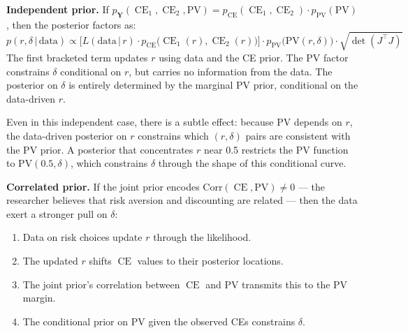 \documentclass[11pt,a4paper]{article}
\theoremstyle{definition}
\newcommand{\given}{\,|\,}
\DeclareMathOperator{\CE}{CE}
\begin{document}
\medskip
\noindent \textbf{Independent prior.} If
$p_{\mathbf{Y}}(\CE_1, \CE_2, \mathrm{PV}) =
p_{\text{CE}}(\CE_1, \CE_2) \cdot p_{\text{PV}}(\mathrm{PV})$,
then the posterior factors as:
\begin{equation}
    p(r, \delta \given \text{data}) \propto
    \Big[L(\text{data} \given r) \cdot p_{\text{CE}}\!\big(\CE_1(r),
    \CE_2(r)\big)\Big]
    \cdot p_{\text{PV}}\!\big(\mathrm{PV}(r, \delta)\big)
    \cdot \sqrt{\det(J^\top J)}
\end{equation}
The first bracketed term updates $r$ using data and the CE prior. The PV
factor constrains $\delta$ conditional on $r$, but carries no information
from the data. The posterior on $\delta$ is entirely determined by the
marginal PV prior, conditional on the data-driven $r$.

Even in this independent case, there is a subtle effect: because $\mathrm{PV}$
depends on $r$, the data-driven posterior on $r$ constrains which $(r, \delta)$
pairs are consistent with the PV prior. A posterior that concentrates $r$ near
0.5 restricts the PV function to $\mathrm{PV}(0.5, \delta)$, which constrains
$\delta$ through the shape of this conditional curve.

\medskip
\noindent \textbf{Correlated prior.} If the joint prior encodes
$\text{Corr}(\CE, \mathrm{PV}) \neq 0$ --- the researcher believes that risk
aversion and discounting are related --- then the data exert a stronger pull
on $\delta$:
\begin{enumerate}
    \item Data on risk choices update $r$ through the likelihood.
    \item The updated $r$ shifts $\CE$ values to their posterior locations.
    \item The joint prior's correlation between $\CE$ and $\mathrm{PV}$
    transmits this to the PV margin.
    \item The conditional prior on $\mathrm{PV}$ given the observed CEs
    constrains $\delta$.
\end{enumerate}
\end{document}
